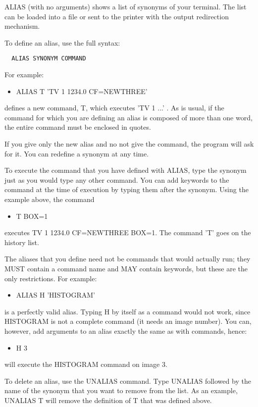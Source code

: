 ALIAS (with no arguments) shows a list of synonyms of your terminal.  The
list can be loaded into a file or sent to the printer with the output
redirection mechanism.

To define an alias, use the full syntax:
\begin{verbatim}
  ALIAS SYNONYM COMMAND
\end{verbatim}
For example:
\begin{itemize}
  \item{ALIAS T 'TV 1 1234.0 CF=NEWTHREE'}
\end{itemize}
defines a new command, T, which executes 'TV 1 ...' . As is usual, if the
command for which you are defining an alias is composed of more than one
word, the entire command must be enclosed in quotes.

If you give only the new alias and no not give the command, the program
will ask for it.  You can redefine a synonym at any time.

To execute the command that you have defined with ALIAS, type the synonym
just as you would type any other command.  You can add keywords to the
command at the time of execution by typing them after the synonym.  Using
the example above, the command
\begin{itemize}
  \item{T BOX=1}
\end{itemize}
executes TV 1 1234.0 CF=NEWTHREE BOX=1.  The command 'T' goes on the
history list. 

The aliases that you define need not be commands that would actually run;
they MUST contain a command name and MAY contain keywords, but these are
the only restrictions.  For example:
\begin{itemize}
  \item{ALIAS H 'HISTOGRAM'}
\end{itemize}
is a perfectly valid alias.  Typing H by itself as a command would not
work, since HISTOGRAM is not a complete command (it needs an image number).
You can, however, add arguments to an alias exactly the same as with
commands, hence:
\begin{itemize}
  \item{H 3\hfill}
\end{itemize}
will execute the HISTOGRAM command on image 3.

To delete an alias, use the UNALIAS command.  Type UNALIAS followed by the
name of the synonym that you want to remove from the list.  As an example,
UNALIAS T will remove the definition of T that was defined above.

